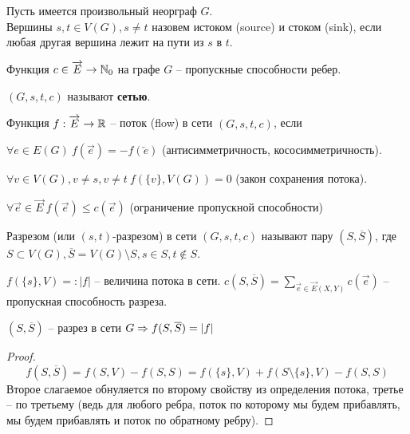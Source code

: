 	\begin{Def}
		Пусть имеется произвольный неорграф $G$. \\
		Вершины $s, t \in V(G), s \neq t$ назовем истоком (source) и стоком (sink), если любая другая вершина лежит на пути из $s$ в $t$. 
	\end{Def}

	\begin{Def}
		Функция $c \in \overrightarrow{E} \to \mathbb{N}_0$ на графе $G$ -- пропускные способности ребер.
	\end{Def}

	\begin{Def}
		$(G, s, t, c)$ называют \textbf{сетью}.
	\end{Def}

	\begin{Def}
		Функция $f : \overrightarrow{E} \to \mathbb{R}$ -- поток (flow) в сети $(G, s, t, c)$, если
		\begin{MyItemize}
			\item $\forall e \in E(G) \ f(\overrightarrow{e}) = -f(\overleftarrow{e})$ (антисимметричность, кососимметричность).
			\item $\forall v \in V(G), v \neq s, v \neq t \ f\left(\{v\}, V(G)\right) = 0$ (закон сохранения потока).   
			\item $\forall \overrightarrow{e} \in \overrightarrow{E} \ f(\overrightarrow{e}) \leqslant c(\overrightarrow{e})$ (ограничение пропускной способности) 
		\end{MyItemize}
	\end{Def}

	\begin{Def}
		Разрезом (или $(s, t)$-разрезом) в сети $(G, s, t, c)$ называют пару $(S, \overline{S})$, где $S \subset V(G), \overline{S} = V(G) \setminus S, s \in S, t \notin S$.   
	\end{Def}

	\begin{Def}
		$f \left(\{s\}, V\right) =: |f|$ -- величина потока в сети.
		$c(S, \overline{S}) = \displaystyle \sum_{\overrightarrow{e} \in \overrightarrow{E}(X, Y)} c(\overrightarrow{e})$ -- пропускная способность разреза.
	\end{Def}

	\begin{Lm}
		$(S, \overline{S})$ -- разрез в сети $G \Rightarrow f(S, \overline{S}) = |f|$
	\end{Lm}

	\begin{proof}
		\[f(S, \overline{S}) = f(S, V) - f(S, S) = f \left(\{s\}, V\right) + f(S \setminus \{s\}, V) - f(S, S)\]
		Второе слагаемое обнуляется по второму свойству из определения потока, третье -- по третьему (ведь для любого ребра, поток по которому мы будем прибавлять, мы будем прибавлять и поток по обратному ребру).
	\end{proof}


